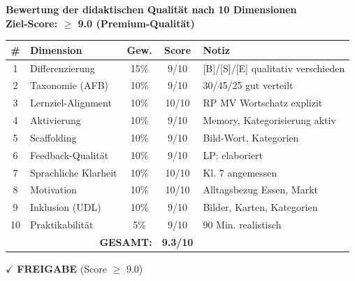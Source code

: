 \documentclass[11pt,a4paper]{article}
\begin{document}
\begin{scorebox}
\textbf{Bewertung der didaktischen Qualität nach 10 Dimensionen}\\
\textbf{Ziel-Score: $\geq$ 9.0 (Premium-Qualität)}

\vspace{1em}
\begin{tabular}{|c|l|c|c|p{4cm}|}
\hline
\textbf{\#} & \textbf{Dimension} & \textbf{Gew.} & \textbf{Score} & \textbf{Notiz} \\
\hline
1 & Differenzierung & 15\% & 9/10 & [B]/[S]/[E] qualitativ verschieden \\
\hline
2 & Taxonomie (AFB) & 10\% & 9/10 & 30/45/25 gut verteilt \\
\hline
3 & Lernziel-Alignment & 10\% & 10/10 & RP MV Wortschatz explizit \\
\hline
4 & Aktivierung & 10\% & 9/10 & Memory, Kategorisierung aktiv \\
\hline
5 & Scaffolding & 10\% & 9/10 & Bild-Wort, Kategorien \\
\hline
6 & Feedback-Qualität & 10\% & 9/10 & LP: elaboriert \\
\hline
7 & Sprachliche Klarheit & 10\% & 10/10 & Kl. 7 angemessen \\
\hline
8 & Motivation & 10\% & 10/10 & Alltagsbezug Essen, Markt \\
\hline
9 & Inklusion (UDL) & 10\% & 9/10 & Bilder, Karten, Kategorien \\
\hline
10 & Praktikabilität & 5\% & 9/10 & 90 Min. realistisch \\
\hline
\multicolumn{3}{|r|}{\textbf{GESAMT:}} & \textbf{9.3/10} & \\
\hline
\end{tabular}

\vspace{1em}
$\checkmark$ \textcolor{successgreen}{\textbf{FREIGABE} (Score $\geq$ 9.0)}
\end{scorebox}
\end{document}
